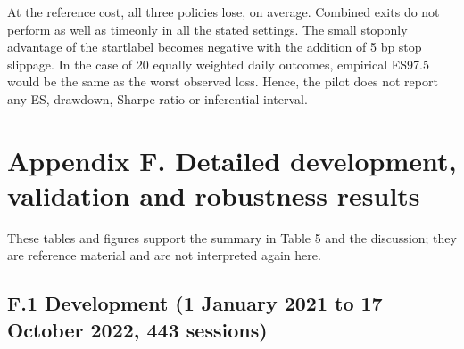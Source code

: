 \documentclass[11pt,a4paper]{article}
\begin{document}
At the reference cost, all three policies lose, on average. Combined exits do not perform as well as time\allowbreak{}only in all the stated settings. The small stop\allowbreak{}only advantage of the start\allowbreak{}label becomes negative with the addition of 5 bp stop slippage. In the case of 20 equally weighted daily outcomes, empirical ES97.5 would be the same as the worst observed loss. Hence, the pilot does not report any ES, drawdown, Sharpe ratio or inferential interval.

\clearpage
\section*{Appendix F. Detailed development, validation and robustness results}

These tables and figures support the summary in Table 5 and the discussion; they are reference material and are not interpreted again here.

\subsection*{F.1 Development (1 January 2021 to 17 October 2022, 443 sessions)}
\end{document}
